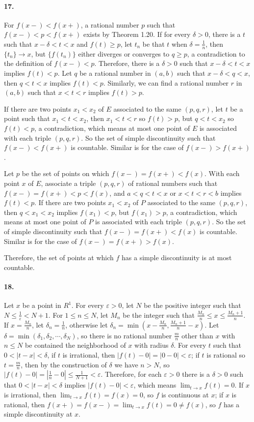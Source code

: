 \documentclass[a4paper]{article}
\begin{document}
\paragraph{17.}
For $f(x-)<f(x+)$, a rational number $p$ such that $f(x-)<p<f(x+)$ exists by Theorem 1.20. If for every $\delta>0$, there is a $t$ such that $x-\delta<t<x$ and $f(t)\geq p$, let $t_n$ be that $t$ when $\delta=\frac{1}{n}$, then $\{t_n\}\to x$, but $\{f(t_n)\}$ either diverges or converges to $q\geq p$, a contradiction to the definition of $f(x-)<p$. Therefore, there is a $\delta>0$ such that $x-\delta<t<x$ implies $f(t)<p$. Let $q$ be a rational number in $(a,b)$ such that $x-\delta<q<x$, then $q<t<x$ implies $f(t)<p$. Similarly, we can find a rational number $r$ in $(a,b)$ such that $x<t<r$ implies $f(t)>p$.

If there are two points $x_1<x_2$ of $E$ associated to the same $(p,q,r)$, let $t$ be a point such that $x_1<t<x_2$, then $x_1<t<r$ so $f(t)>p$, but $q<t<x_2$ so $f(t)<p$, a contradiction, which means at most one point of $E$ is associated with each triple $(p,q,r)$. So the set of simple discontinuity such that $f(x-)<f(x+)$ is countable. Similar is for the case of $f(x-)>f(x+)$.

Let $p$ be the set of points on which $f(x-)=f(x+)<f(x)$. With each point $x$ of $E$, associate a triple $(p,q,r)$ of rational numbers such that $f(x-)=f(x+)<p<f(x)$, and $a<q<t<x$ or $x<t<r<b$ implies $f(t)<p$. If there are two points $x_1<x_2$ of $P$ associated to the same $(p,q,r)$, then $q<x_1<x_2$ implies $f(x_1)<p$, but $f(x_1)>p$, a contradiction, which means at most one point of $P$ is associated with each triple $(p,q,r)$. So the set of simple discontinuity such that $f(x-)=f(x+)<f(x)$ is countable. Similar is for the case of $f(x-)=f(x+)>f(x)$.

Therefore, the set of points at which $f$ has a simple discontinuity is at most countable.

\paragraph{18.}
Let $x$ be a point in $R^1$. For every $\varepsilon>0$, let $N$ be the positive integer such that $N\leq\frac{1}{\varepsilon}<N+1$. For $1\leq n\leq N$, let $M_n$ be the integer such that $\frac{M_n}{n}\leq x\leq \frac{M_n+1}{n}$. If $x=\frac{M_n}{n}$, let $\delta_n=\frac{1}{n}$, otherwise let $\delta_n=\min(x-\frac{M_n}{n},\frac{M_n+1}{n}-x)$. Let $\delta=\min(\delta_1,\delta_2,\cdots,\delta_N)$, so there is no rational number $\frac{m}{n}$ other than $x$ with $n\leq N$ be contained the neighborhood of $x$ with radius $\delta$. For every $t$ such that $0<|t-x|<\delta$, if $t$ is irrational, then $|f(t)-0|=|0-0|<\varepsilon$; if $t$ is rational so $t=\frac{m}{n}$, then by the construction of $\delta$ we have $n>N$, so $|f(t)-0|=|\frac{1}{n}-0|\leq\frac{1}{N+1}<\varepsilon$. Therefore, for each $\varepsilon>0$ there is a $\delta>0$ such that $0<|t-x|<\delta$ implies $|f(t)-0|<\varepsilon$, which means $\lim_{t\to x}f(t)=0$. If $x$ is irrational, then $\lim_{t\to x}f(t)=f(x)=0$, so $f$ is continuous at $x$; if $x$ is rational, then $f(x+)=f(x-)=\lim_{t\to x}f(t)=0\neq f(x)$, so $f$ has a simple discontinuity at $x$.
\end{document}
